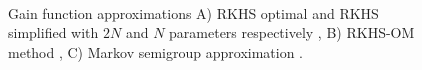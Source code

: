 \begin{figure}[htbp]
	\centering
	\mbox{
	}
	\mbox{
	}
	\mbox{
	}
	\caption[RKHS and coifman performance]{Gain function approximations A) RKHS optimal and RKHS simplified with $2N$ and $N$ parameters respectively \cite{radmey18a}, B) RKHS-OM method \cite{radmey19}, C) Markov semigroup approximation \cite{tagmeh16}.}
	\label{fig:diff_td_rkhs_coif_d2510}
\end{figure}


